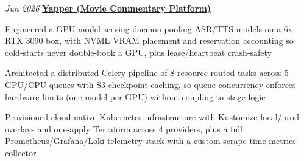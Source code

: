 \begin{twocolentry}{
    \textit{Jun 2026}
  }
  \textbf{\href{https://github.com/yuchia329/yapper}{Yapper (Movie Commentary Platform)}}
  \end{twocolentry}
  \begin{onecolentry}
  \begin{highlights}
    \item Engineered a GPU model-serving daemon pooling ASR/TTS models on a 6x RTX 3090 box, with NVML VRAM placement and reservation accounting so cold-starts never double-book a GPU, plus lease/heartbeat crash-safety
  
    \item Architected a distributed Celery pipeline of 8 resource-routed tasks across 5 GPU/CPU queues with S3 checkpoint caching, so queue concurrency enforces hardware limits (one model per GPU) without coupling to stage logic
  
    \item Provisioned cloud-native Kubernetes infrastructure with Kustomize local/prod overlays and one-apply Terraform across 4 providers, plus a full Prometheus/Grafana/Loki telemetry stack with a custom scrape-time metrics collector
  
  
  
  
  

\end{highlights}
\end{onecolentry}
